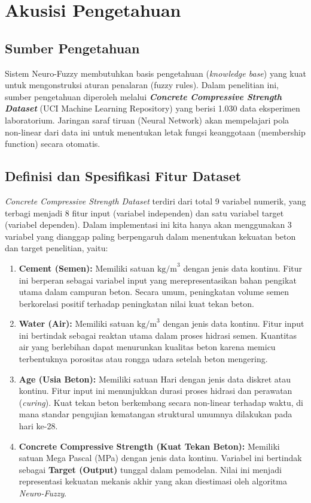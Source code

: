 \section{Akusisi Pengetahuan}
\subsection{Sumber Pengetahuan}
Sistem Neuro-Fuzzy membutuhkan basis pe\-nge\-tah\-uan (\textit{know\-led\-ge ba\-se}) yang kuat untuk mengonstruksi aturan penalaran (fuzzy rules). 
Dalam penelitian ini, sumber pengetahuan diperoleh melalui \textbf{\textit{Concrete Compressive Strength Dataset}} (UCI Machine Learning Repository) yang berisi 1.030 data eksperimen laboratorium. Jaringan saraf tiruan (Neural Network) akan mempelajari pola non-linear dari data ini untuk menentukan letak fungsi keanggotaan (membership function) secara otomatis.
\subsection{Definisi dan Spesifikasi Fitur Dataset}
\textit{Concrete Compressive Strength Dataset} terdiri dari total 9 va\-ria\-bel nu\-me\-rik, yang terbagi menjadi 8 fitur input (variabel independen) dan sa\-tu va\-ria\-bel tar\-get (variabel dependen). 
Dalam implementasi ini kita hanya akan menggunakan 3 variabel yang dianggap paling berpengaruh dalam menentukan kekuatan beton dan target penelitian, yaitu:

\begin{enumerate}
    \item \textbf{Cement (Semen):} 
    Memiliki satuan $\text{kg/m}^3$ dengan jenis data kontinu. Fitur ini berperan sebagai variabel input yang merepresentasikan bahan pengikat utama dalam campuran beton. Secara umum, peningkatan volume semen berkorelasi positif terhadap peningkatan nilai kuat tekan beton.
    
    \item \textbf{Water (Air):} 
    Memiliki satuan $\text{kg/m}^3$ dengan jenis data kontinu. Fitur input ini bertindak sebagai reaktan utama dalam proses hidrasi semen. Kuantitas air yang berlebihan dapat menurunkan kualitas beton karena memicu terbentuknya porositas atau rongga udara setelah beton mengering.
    
    \item \textbf{Age (Usia Beton):} 
    Memiliki satuan Hari dengan jenis data diskret atau kontinu. Fitur input ini menunjukkan durasi proses hidrasi dan perawatan (\textit{curing}). Kuat tekan beton berkembang secara non-linear terhadap waktu, di mana standar pengujian kematangan struktural umumnya dilakukan pada hari ke-28.
    
    \item \textbf{Concrete Compressive Strength (Kuat Tekan Beton):} 
    Memiliki satuan Mega Pascal (MPa) dengan jenis data kontinu. Variabel ini bertindak sebagai \textbf{Target (Output)} tunggal dalam pemodelan. Nilai ini menjadi representasi kekuatan mekanis akhir yang akan diestimasi oleh algoritma \textit{Neuro-Fuzzy}.
\end{enumerate}


